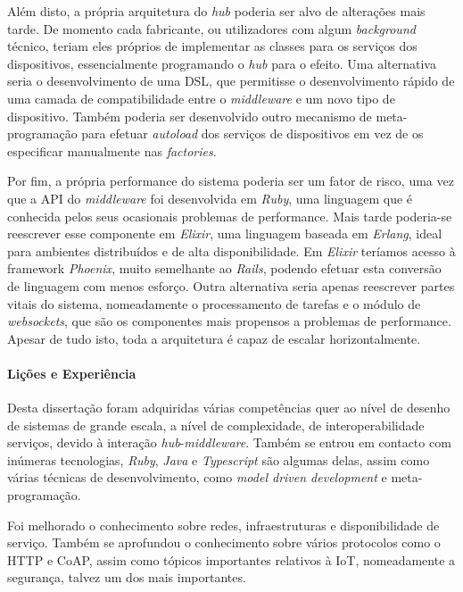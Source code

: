 Além disto, a própria arquitetura do \textit{hub} poderia ser alvo de alterações mais tarde. De momento cada fabricante, ou utilizadores com algum \textit{background} técnico, teriam eles próprios de implementar as classes para os serviços dos dispositivos, essencialmente programando o \textit{hub} para o efeito. Uma alternativa seria o desenvolvimento de uma DSL, que permitisse o desenvolvimento rápido de uma camada de compatibilidade entre o \textit{middleware} e um novo tipo de dispositivo. Também poderia ser desenvolvido outro mecanismo de meta-programação para efetuar \textit{autoload} dos serviços de dispositivos em vez de os especificar manualmente nas \textit{factories}.

Por fim, a própria performance do sistema poderia ser um fator de risco, uma vez que a API do \textit{middleware} foi desenvolvida em \textit{Ruby}, uma linguagem que é conhecida pelos seus ocasionais problemas de performance. Mais tarde poderia-se reescrever esse componente em \textit{Elixir}, uma linguagem baseada em \textit{Erlang}, ideal para ambientes distribuídos e de alta disponibilidade. Em \textit{Elixir} teríamos acesso à framework \textit{Phoenix}, muito semelhante ao \textit{Rails}, podendo efetuar esta conversão de linguagem com menos esforço. Outra alternativa seria apenas reescrever partes vitais do sistema, nomeadamente o processamento de tarefas e o módulo de \textit{websockets}, que são os componentes mais propensos a problemas de performance. Apesar de tudo isto, toda a arquitetura é capaz de escalar horizontalmente.

\paragraph*{Lições e Experiência}

Desta dissertação foram adquiridas várias competências quer ao nível de desenho de sistemas de grande escala, a nível de complexidade, de interoperabilidade serviços, devido à interação \textit{hub}-\textit{middleware}. Também se entrou em contacto com inúmeras tecnologias, \textit{Ruby}, \textit{Java} e \textit{Typescript} são algumas delas, assim como várias técnicas de desenvolvimento, como \textit{model driven development} e meta-programação.

Foi melhorado o conhecimento sobre redes, infraestruturas e disponibilidade de serviço. Também se aprofundou o conhecimento sobre vários protocolos como o HTTP e CoAP, assim como tópicos importantes relativos à IoT, nomeadamente a segurança, talvez um dos mais importantes.

